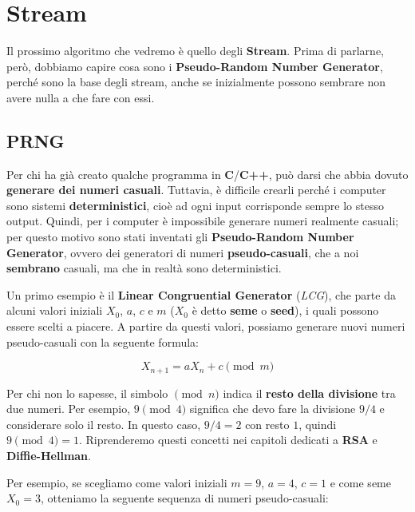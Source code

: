 \documentclass{report}
\begin{document}
\section{Stream}

Il prossimo algoritmo che vedremo è quello degli \textbf{Stream}.  
Prima di parlarne, però, dobbiamo capire cosa sono i \textbf{Pseudo-Random Number Generator}, perché sono la base degli stream, anche se inizialmente possono sembrare non avere nulla a che fare con essi.

\subsection{PRNG}

Per chi ha già creato qualche programma in \textbf{C}/\textbf{C++}, può darsi che abbia dovuto \textbf{generare dei numeri casuali}.  
Tuttavia, è difficile crearli perché i computer sono sistemi \textbf{deterministici}, cioè ad ogni input corrisponde sempre lo stesso output.  
Quindi, per i computer è impossibile generare numeri realmente casuali; per questo motivo sono stati inventati gli \textbf{Pseudo-Random Number Generator}, ovvero dei generatori di numeri \textbf{pseudo-casuali}, che a noi \textbf{sembrano} casuali, ma che in realtà sono deterministici.


Un primo esempio è il \textbf{Linear Congruential Generator} (\textit{LCG}), che parte da alcuni valori iniziali $X_0$, $a$, $c$ e $m$ ($X_0$ è detto \textbf{seme} o \textbf{seed}), i quali possono essere scelti a piacere.  
A partire da questi valori, possiamo generare nuovi numeri pseudo-casuali con la seguente formula:


\begin{equation*}
    X_{n+1} = aX_n + c \pmod{m}
\end{equation*}

Per chi non lo sapesse, il simbolo $\pmod{n}$ indica il \textbf{resto della divisione} tra due numeri.  
Per esempio, $9 \pmod{4}$ significa che devo fare la divisione $9/4$ e considerare solo il resto.  
In questo caso, $9/4 = 2$ con resto $1$, quindi $9 \pmod{4} = 1$.  
Riprenderemo questi concetti nei capitoli dedicati a \textbf{RSA} e \textbf{Diffie-Hellman}.


Per esempio, se scegliamo come valori iniziali $m = 9$, $a = 4$, $c = 1$ e come seme $X_0 = 3$, otteniamo la seguente sequenza di numeri pseudo-casuali:
\end{document}
